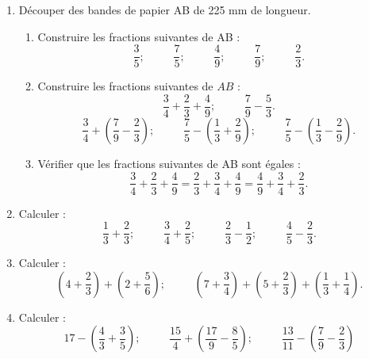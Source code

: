\documentclass[12 pt]{extarticle}
\theoremstyle{plain}
\begin{document}
\begin{enumerate}
\item Découper des bandes de papier AB de 225 mm de 
longueur. \begin{enumerate}
\item Construire les fractions suivantes de AB : 
\[ \frac35; \phantom{meow}\frac75; \phantom{meow}
\frac49; \phantom{meow}\frac79; \phantom{meow}\frac23.\]
\item Construire les fractions suivantes de $AB$ : 
\[\frac34+\frac23+\frac49; \phantom{meow}\frac79-\frac53.\]
\[\frac34+\left(\frac79-\frac23\right);  \phantom{meow} \frac75-\left(\frac13+\frac29\right);
 \phantom{meow}\frac75-\left(\frac13-\frac29\right).\]
 
 \item Vérifier que les fractions suivantes de AB sont égales : 
 \[\frac34+\frac23+\frac49 = \frac23+\frac34+\frac49 = \frac49 + \frac34 + \frac23.\]
 \end{enumerate}
 \item Calculer : 
 \[\frac13 + \frac23;  \phantom{meow}
 \frac34+\frac25; \phantom{meow}
 \frac23-\frac12;  \phantom{meow}
 \frac45-\frac23.\]
 \item Calculer : \[\left(4+\frac23\right) + \left(2+ \frac56\right);  \phantom{meow}
 \left(7 + \frac34\right) + \left(5 + \frac23\right)
 + \left(\frac13+\frac14\right).\]
 \item Calculer :\[ 17 - \left(\frac43 + \frac35\right) ;  \phantom{meow}
 \frac{15}4 + \left(\frac{17}9-\frac85\right); 
  \phantom{meow}
  \frac{13}{11} - \left(\frac79 - \frac23\right)\]


\end{enumerate}
\end{document}
